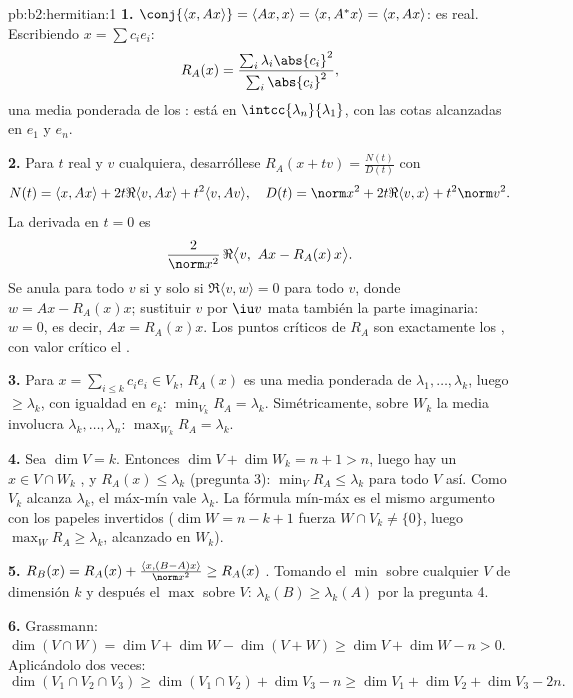\begin{solution}{pb:b2:hermitian:1}
\textbf{1.} $\conj{\langle x, Ax\rangle} = \langle Ax, x\rangle =
\langle x, A^*x\rangle = \langle x, Ax\rangle$: es real. Escribiendo
$x = \sum c_ie_i$:
\[
R_A(x) = \frac{\sum_i\lambda_i\abs{c_i}^2}
{\sum_i\abs{c_i}^2} ,
\]
una media ponderada de los : está en
$\intcc{\lambda_n}{\lambda_1}$, con las cotas alcanzadas en $e_1$ y
$e_n$.

\textbf{2.} Para $t$ real y $v$ cualquiera, desarróllese $R_A(x + tv)
= \frac{N(t)}{D(t)}$ con
\[
N(t) = \langle x, Ax\rangle + 2t\Re\langle v, Ax\rangle +
t^2\langle v, Av\rangle,
\quad
D(t) = \norm x^2 + 2t\Re\langle v, x\rangle + t^2\norm v^2 .
\]
La derivada en $t = 0$ es
\[
\frac{2}{\norm x^2}\,
\Re\bigl\langle v,\ Ax - R_A(x)\,x\bigr\rangle .
\]
Se anula para todo $v$ si y solo si $\Re\langle v, w\rangle = 0$ para
todo $v$, donde $w = Ax - R_A(x)x$; sustituir $v$ por $\iu v$ mata
también la parte imaginaria: $w = 0$, es decir, $Ax = R_A(x)x$. Los
puntos críticos de $R_A$ son exactamente los , con
valor crítico el .

\textbf{3.} Para $x = \sum_{i\leq k}c_ie_i \in V_k$, $R_A(x)$ es una
media ponderada de $\lambda_1, \dots, \lambda_k$, luego $\geq
\lambda_k$, con igualdad en $e_k$: $\min_{V_k} R_A = \lambda_k$.
Simétricamente, sobre $W_k$ la media involucra $\lambda_k, \dots,
\lambda_n$: $\max_{W_k}R_A = \lambda_k$.

\textbf{4.} Sea $\dim V = k$. Entonces $\dim V + \dim W_k = n + 1 >
n$, luego hay un $x \in V \cap W_k$ , y $R_A(x) \leq
\lambda_k$ (pregunta 3): $\min_{V}R_A \leq \lambda_k$ para todo $V$
así. Como $V_k$ alcanza $\lambda_k$, el máx-mín vale $\lambda_k$. La
fórmula mín-máx es el mismo argumento con los papeles invertidos
($\dim W = n - k + 1$ fuerza $W \cap V_k \neq \{0\}$, luego $\max_W
R_A \geq \lambda_k$, alcanzado en $W_k$).

\textbf{5.} $R_B(x) = R_A(x) + \frac{\langle x, (B-A)x\rangle}{\norm
x^2} \geq R_A(x)$ . Tomando el $\min$ sobre cualquier
$V$ de dimensión $k$ y después el $\max$ sobre $V$: $\lambda_k(B)
\geq \lambda_k(A)$ por la pregunta 4.

\textbf{6.} Grassmann: $\dim(V\cap W) = \dim V + \dim W - \dim(V + W)
\geq \dim V + \dim W - n > 0$. Aplicándolo dos veces:
\[
\dim(V_1\cap V_2\cap V_3)
\geq \dim(V_1\cap V_2) + \dim V_3 - n
\geq \dim V_1 + \dim V_2 + \dim V_3 - 2n .
\]


\end{solution}
